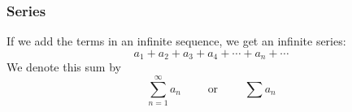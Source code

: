 \begin{frame}
\frametitle{ Series}
\begin{definition}[Series]
If we add the terms in an infinite sequence, we get an infinite series:
\[
a_1 + a_2 + a_3 + a_4 + \cdots + a_n + \cdots 
\]
We denote this sum by
\[
\sum_{n = 1}^\infty a_n \qquad \textrm{ or } \qquad \sum a_n
\]
\end{definition}
\end{frame}
